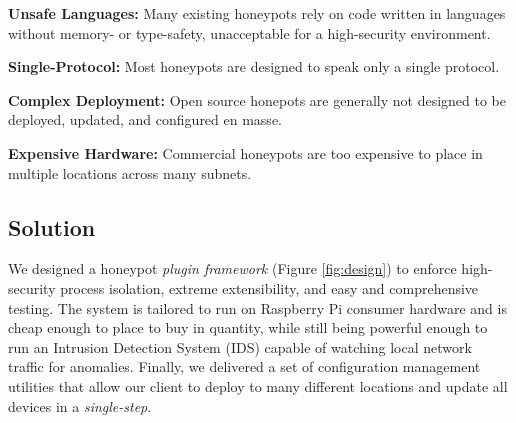 \begin{itemize}
\setlength{\columnsep}{0cm}
\def\columnseprulecolor{\color{white}}
\begin{centering}
\begin{multicols}{2}
\raggedright\item\large{\textbf{Unsafe Languages:} Many existing honeypots rely on code written in languages without memory- or type-safety, unacceptable for a high-security environment.}

\raggedright\item\large{\textbf{Single-Protocol:} Most honeypots are designed to speak only a single protocol.}

\raggedright\item\large{\textbf{Complex Deployment:} Open source honepots are generally not designed to be deployed, updated, and configured en masse.}

\raggedright\item\large{\textbf{Expensive Hardware:} Commercial honeypots are too expensive to place in multiple locations across many subnets.}
\end{multicols}
\end{centering}
\end{itemize}

\subsection*{Solution}

We designed a honeypot \textit{plugin framework} (Figure \ref{fig:design})
to enforce high-security process isolation, extreme extensibility, and
easy and comprehensive testing. The system is tailored to run on Raspberry
Pi consumer hardware and is cheap enough to place to buy in quantity, while
still being powerful enough to run an Intrusion Detection System (IDS) capable
of watching local network traffic for anomalies. Finally, we delivered a set
of configuration management utilities that allow our client to deploy to
many different locations and update all devices in a \textit{single-step}.
